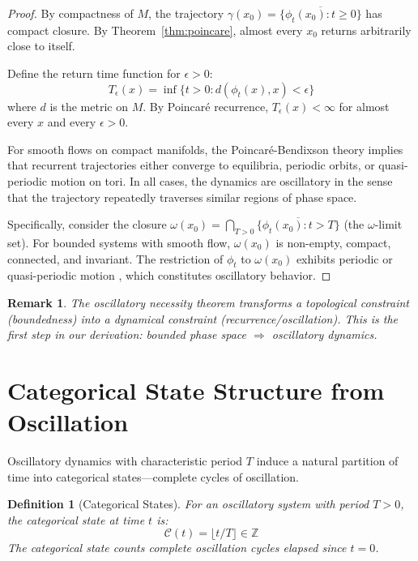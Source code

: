 \documentclass[twocolumn,10pt,a4paper]{article}
\newtheorem{definition}[theorem]{Definition}
\newtheorem{remark}[theorem]{Remark}
\newcommand{\Z}{\mathbb{Z}}
\begin{document}
\begin{proof}
By compactness of $M$, the trajectory $\gamma(x_0) = \overline{\{\phi_t(x_0) : t \geq 0\}}$ has compact closure. By Theorem~\ref{thm:poincare}, almost every $x_0$ returns arbitrarily close to itself.

Define the return time function for $\epsilon > 0$:
\begin{equation}
T_\epsilon(x) = \inf\{t > 0 : d(\phi_t(x), x) < \epsilon\}
\end{equation}
where $d$ is the metric on $M$. By Poincar\'{e} recurrence, $T_\epsilon(x) < \infty$ for almost every $x$ and every $\epsilon > 0$.

For smooth flows on compact manifolds, the Poincar\'{e}-Bendixson theory \citep{poincare1881memoire, bendixson1901courbes} implies that recurrent trajectories either converge to equilibria, periodic orbits, or quasi-periodic motion on tori. In all cases, the dynamics are oscillatory in the sense that the trajectory repeatedly traverses similar regions of phase space.

Specifically, consider the closure $\omega(x_0) = \bigcap_{T>0} \overline{\{\phi_t(x_0) : t > T\}}$ (the $\omega$-limit set). For bounded systems with smooth flow, $\omega(x_0)$ is non-empty, compact, connected, and invariant. The restriction of $\phi_t$ to $\omega(x_0)$ exhibits periodic or quasi-periodic motion \citep{smale1967differentiable}, which constitutes oscillatory behavior.
\end{proof}

\begin{remark}
The oscillatory necessity theorem transforms a topological constraint (boundedness) into a dynamical constraint (recurrence/oscillation). This is the first step in our derivation: bounded phase space $\Rightarrow$ oscillatory dynamics.
\end{remark}

\section{Categorical State Structure from Oscillation}
\label{sec:categories}

Oscillatory dynamics with characteristic period $T$ induce a natural partition of time into categorical states---complete cycles of oscillation.

\begin{definition}[Categorical States]
\label{def:categorical}
For an oscillatory system with period $T > 0$, the \emph{categorical state} at time $t$ is:
\begin{equation}
\mathcal{C}(t) = \lfloor t/T \rfloor \in \Z
\end{equation}
The categorical state counts complete oscillation cycles elapsed since $t = 0$.
\end{definition}
\end{document}

